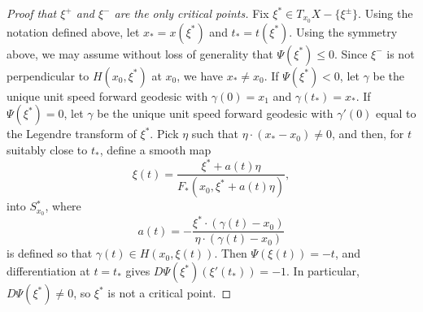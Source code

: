 \begin{proof}[Proof that $\xi^+$ and $\xi^-$ are the only critical points]
    Fix $\xi^* \in T_{x_0} X - \{ \xi^{\pm} \}$. Using the notation defined above, let $x_* = x(\xi^*)$ and $t_* = t(\xi^*)$. Using the symmetry above, we may assume without loss of generality that $\Psi(\xi^*) \leq 0$. Since $\xi^-$ is not perpendicular to $H(x_0,\xi^*)$ at $x_0$, we have $x_* \neq x_0$. If $\Psi(\xi^*) < 0$, let $\gamma$ be the unique unit speed forward geodesic with $\gamma(0) = x_1$ and $\gamma(t_*) = x_*$. If $\Psi(\xi^*) = 0$, let $\gamma$ be the unique unit speed forward geodesic with $\gamma'(0)$ equal to the Legendre transform of $\xi^*$. Pick $\eta$ such that $\eta \cdot (x_* - x_0) \neq 0$, and then, for $t$ suitably close to $t_*$, define a smooth map
    \begin{equation} \xi(t) = \frac{\xi^* + a(t) \eta}{F_*(x_0, \xi^* + a(t) \eta)}, \end{equation}
    into $S\!_{x_0}^*$, where
    \begin{equation} a(t) = - \frac{\xi^* \cdot ( \gamma(t) - x_0 )}{\eta \cdot ( \gamma(t) - x_0 )} \end{equation}
    is defined so that $\gamma(t) \in H(x_0, \xi(t))$. Then $\Psi( \xi(t) ) = -t$, and differentiation at $t = t_*$ gives $D\Psi( \xi^* ) ( \xi'(t_*) ) = -1$. In particular, $D \Psi( \xi^* ) \neq 0$, so $\xi^*$ is not a critical point. \qedhere




    \end{proof}

